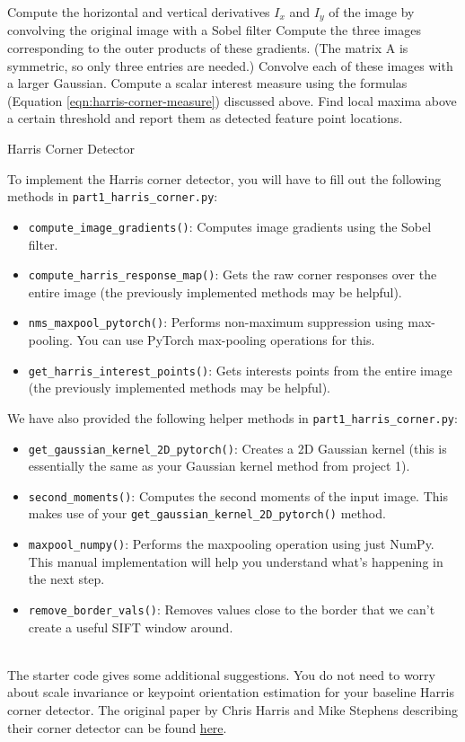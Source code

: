 \documentclass{article}
\begin{document}
\begin{algorithm}[H]
\SetAlgoLined
 Compute the horizontal and vertical derivatives  $I_x$ and $I_y$ of the image by convolving the original image with a Sobel filter\;
 Compute the three images corresponding to the outer products of these gradients.
(The matrix A is symmetric, so only three entries are needed.)\;
Convolve each of these images with a larger Gaussian.\;
Compute a scalar interest measure using the formulas (Equation \ref{eqn:harris-corner-measure}) discussed above.\;
Find local maxima above a certain threshold and report them as detected feature
point locations.\;
 \caption{Harris Corner Detector}
\end{algorithm}

\noindent To implement the Harris corner detector, you will have to fill out the following methods in \lstinline{part1_harris_corner.py}:
\begin{itemize}
  \item \lstinline{compute_image_gradients()}: Computes image gradients using the Sobel filter.
  \item \lstinline{compute_harris_response_map()}: Gets the raw corner responses over the entire image (the previously implemented methods may be helpful).
  \item \lstinline{nms_maxpool_pytorch()}: Performs non-maximum suppression using max-pooling. You can use PyTorch max-pooling operations for this.
  \item \lstinline{get_harris_interest_points()}: Gets interests points from the entire image (the previously implemented methods may be helpful).
\end{itemize}
\noindent We have also provided the following helper methods in \lstinline{part1_harris_corner.py}:
\begin{itemize}
  \item \lstinline{get_gaussian_kernel_2D_pytorch()}: Creates a 2D Gaussian kernel (this is essentially the same as your Gaussian kernel method from project 1).
  \item \lstinline{second_moments()}: Computes the second moments of the input image. This makes use of your
  \lstinline{get_gaussian_kernel_2D_pytorch()} method.
  \item \lstinline{maxpool_numpy()}: Performs the maxpooling operation using just NumPy. This manual implementation will help you understand what's happening in the next step.
  \item \lstinline{remove_border_vals()}: Removes values close to the border that we can't create a useful SIFT window around. 
\end{itemize}
\\
The starter code gives some additional suggestions. You do not need to worry about scale invariance or keypoint orientation estimation for your baseline Harris corner detector. The original paper by Chris Harris and Mike Stephens describing their corner detector can be found \href{http://www.bmva.org/bmvc/1988/avc-88-023.pdf}{here}. 
\end{document}
